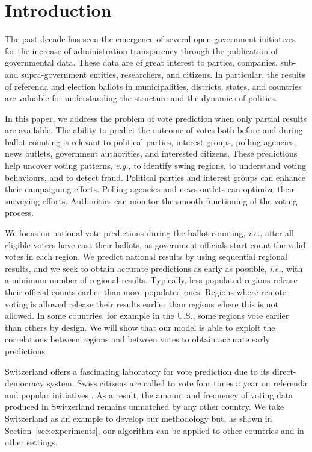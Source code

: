 \section{Introduction}%
\label{sec:introduction}

The past decade has seen the emergence of several open-government initiatives for the increase of administration transparency through the publication of governmental data.
These data are of great interest to parties, companies, sub- and supra-government entities, researchers, and citizens.
In particular, the results of referenda and election ballots in municipalities, districts, states, and countries are valuable for understanding the structure and the dynamics of politics.

In this paper, we address the problem of vote prediction when only partial results are available.
The ability to predict the outcome of votes both before and during ballot counting is relevant to political parties, interest groups, polling agencies, news outlets, government authorities, and interested citizens.
These predictions help uncover voting patterns, \textit{e.g.}, to identify swing regions, to understand voting behaviours, and to detect fraud.
Political parties and interest groups can enhance their campaigning efforts.
Polling agencies and news outlets can optimize their surveying efforts.
Authorities can monitor the smooth functioning of the voting process.

We focus on national vote predictions during the ballot counting, \textit{i.e.}, after all eligible voters have cast their ballots, as government officials start count the valid votes in each region.
We predict national results by using sequential regional results, and we seek to obtain accurate predictions as early as possible, \textit{i.e.}, with a minimum number of regional results.
Typically, less populated regions release their official counts earlier than more populated ones.
Regions where remote voting is allowed release their results earlier than regions where this is not allowed.
In some countries, for example in the U.S., some regions vote earlier than others by design.
We will show that our model is able to exploit the correlations between regions and between votes to obtain accurate early predictions.

Switzerland offers a fascinating laboratory for vote prediction due to its direct-democracy system.
Swiss citizens are called to vote four times a year on referenda and popular initiatives \citep{confederation2019democracy, confederation2019popular}.
As a result, the amount and frequency of voting data produced in Switzerland remains unmatched by any other country.
We take Switzerland as an example to develop our methodology but, as shown in Section~\ref{sec:experiments}, our algorithm can be applied to other countries and in other settings.

